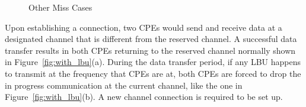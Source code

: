 \begin{figure}[ht]
{\begin{minipage}[c][1.4\width]{
	   0.31\textwidth}
	\end{minipage}}
 \hfill	
\caption{Other Miss Cases}
\label{fig:other_miss_cases}
\end{figure}

Upon establishing a connection, two CPEs would send and receive data at a designated channel that is different from the reserved channel. A successful data transfer results in both CPEs returning to the reserved channel normally shown in Figure~\ref{fig:with_lbu}(a). During the data transfer period, if any LBU happens to transmit at the frequency that CPEs are at, both CPEs are forced to drop the in progress communication at the current channel, like the one in Figure~\ref{fig:with_lbu}(b). A new channel connection is required to be set up. 



